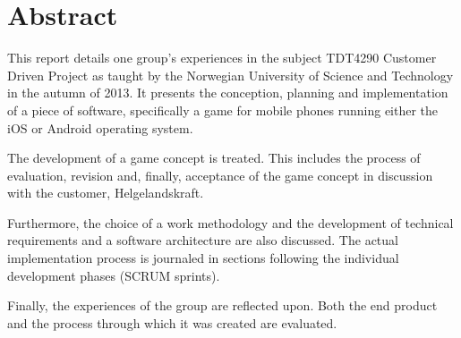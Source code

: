 
\chapter*{Abstract}

This report details one group's experiences in the subject TDT4290 Customer
Driven Project as taught by the Norwegian University of Science and Technology
in the autumn of 2013. It presents the conception, planning and implementation
of a piece of software, specifically a game for mobile phones running either
the iOS or Android operating system.

The development of a game concept is treated. This includes the process of
evaluation, revision and, finally, acceptance of the game concept in discussion
with the customer, Helgelandskraft.

Furthermore, the choice of a work methodology and the development of technical
requirements and a software architecture are also discussed. The actual
implementation process is journaled in sections following the individual
development phases (SCRUM sprints).

Finally, the experiences of the group are reflected upon. Both the end product
and the process through which it was created are evaluated.
